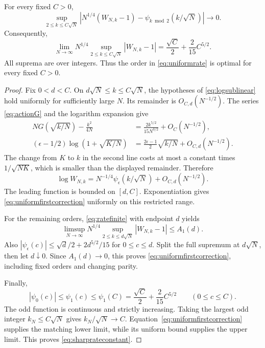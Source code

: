 \begin{theorem}\label{thm:firstcorrection}
For every fixed $C>0$,
\begin{equation}\label{eq:uniformfirstcorrection}
\sup_{2\le k\le C\sqrt N}
\left|N^{1/4}(W_{N,k}-1)-\psi_{k\bmod2}(k/\sqrt N)\right|
\longrightarrow0.
\end{equation}
Consequently,
\begin{equation}\label{eq:sharprateconstant}
\lim_{N\to\infty}N^{1/4}
\sup_{2\le k\le C\sqrt N}|W_{N,k}-1|
=\frac{\sqrt C}{2}+\frac{2}{15}C^{5/2}.
\end{equation}
All suprema are over integers. Thus the order in \eqref{eq:uniformrate} is optimal for every fixed $C>0$.
\end{theorem}
\begin{proof}
Fix $0<d<C$. On $d\sqrt N\le k\le C\sqrt N$, the hypotheses of \eqref{eq:logsublinear} hold uniformly for sufficiently large $N$. Its remainder is $O_{C,d}(N^{-1/2})$. The series \eqref{eq:actionG} and the logarithm expansion give
\begin{align*}
NG(\sqrt{k/N})-\frac{k^2}{4N}
&=\frac{2k^{5/2}}{15N^{3/2}}+O_C(N^{-1/2}),\\
(\epsilon-1/2)\log(1+\sqrt{K/N})
&=\frac{2\epsilon-1}{2}\sqrt{k/N}+O_{C,d}(N^{-1/2}).
\end{align*}
The change from $K$ to $k$ in the second line costs at most a constant times $1/\sqrt{NK}$, which is smaller than the displayed remainder. Therefore
\[
\log W_{N,k}
=N^{-1/4}\psi_\epsilon(k/\sqrt N)+O_{C,d}(N^{-1/2}).
\]
The leading function is bounded on $[d,C]$. Exponentiation gives \eqref{eq:uniformfirstcorrection} uniformly on this restricted range.

For the remaining orders, \eqref{eq:ratefinite} with endpoint $d$ yields
\[
\limsup_{N\to\infty}N^{1/4}
\sup_{2\le k\le d\sqrt N}|W_{N,k}-1|\le A_1(d).
\]
Also $|\psi_\epsilon(c)|\le\sqrt d/2+2d^{5/2}/15$ for $0\le c\le d$. Split the full supremum at $d\sqrt N$, then let $d\downarrow0$. Since $A_1(d)\to0$, this proves \eqref{eq:uniformfirstcorrection}, including fixed orders and changing parity.

Finally,
\[
|\psi_0(c)|\le\psi_1(c)\le\psi_1(C)
=\frac{\sqrt C}{2}+\frac{2}{15}C^{5/2}
\qquad(0\le c\le C).
\]
The odd function is continuous and strictly increasing. Taking the largest odd integer $k_N\le C\sqrt N$ gives $k_N/\sqrt N\to C$. Equation~\eqref{eq:uniformfirstcorrection} supplies the matching lower limit, while its uniform bound supplies the upper limit. This proves \eqref{eq:sharprateconstant}.
\end{proof}

